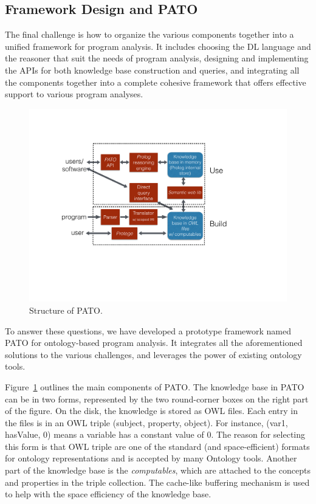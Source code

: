 \subsection{Framework Design and PATO} 

The final challenge is how to organize the various components together
into a unified framework for program analysis. It includes choosing
the DL language and the reasoner that suit the needs of program
analysis, designing and implementing the APIs for both knowledge base
construction and queries, and integrating all the components together
into a complete cohesive framework that offers effective support to
various program analyses. 

\begin{figure}[ht]
\centering
\includegraphics[width=.7\columnwidth]{graph/patoDiagram.pdf}
\caption{Structure of PATO.}
\label{fig:pato}
\end{figure}

To answer these questions, we have developed a prototype framework
named PATO for ontology-based program analysis. It integrates all the
aforementioned solutions to the various challenges, and leverages the
power of existing ontology tools.

Figure~\ref{fig:pato} outlines the main components of PATO. The
knowledge base in PATO can be in two forms, represented by the two
round-corner boxes on the right part of the figure. On the disk, the knowledge is stored as OWL files.
Each entry in the files is in an
OWL triple \textsf{(subject, property, object)}. For instance,
\textsf{(var1, hasValue, 0)} means a variable has a constant value of 0. The
reason for selecting this form is that OWL triple are
 one of the standard
(and space-efficient) formats for ontology representations and is
accepted by many Ontology tools. Another part of the knowledge base is
the {\em computables}, which are attached to the concepts and
properties in the triple collection. The cache-like buffering mechanism
is used to help with the space efficiency of the knowledge base.

